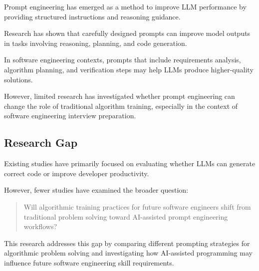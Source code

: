 Prompt engineering has emerged as a method to improve LLM performance by
providing structured instructions and reasoning guidance.

Research has shown that carefully designed prompts can improve model outputs
in tasks involving reasoning, planning, and code generation.

In software engineering contexts, prompts that include requirements analysis,
algorithm planning, and verification steps may help LLMs produce higher-quality
solutions.

However, limited research has investigated whether prompt engineering can
change the role of traditional algorithm training, especially in the context
of software engineering interview preparation.


\subsection{Research Gap}

Existing studies have primarily focused on evaluating whether LLMs can generate
correct code or improve developer productivity.

However, fewer studies have examined the broader question:

\begin{quote}
Will algorithmic training practices for future software engineers shift from
traditional problem solving toward AI-assisted prompt engineering workflows?
\end{quote}


This research addresses this gap by comparing different prompting strategies
for algorithmic problem solving and investigating how AI-assisted programming
may influence future software engineering skill requirements.
